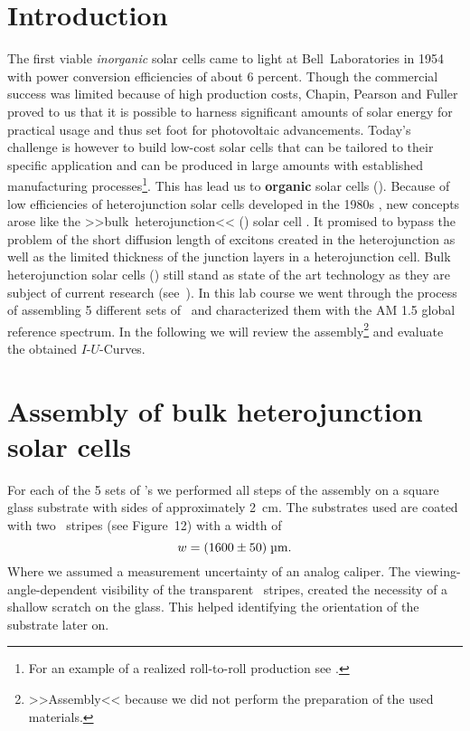 \documentclass[a4paper,10pt,twocolumn]{article}
\begin{document}
\begin{extract*}

\section*{Introduction}%

The first viable \textit{inorganic} solar cells came to light at Bell~Laboratories in 1954 \cite{siliconSC_1}\cite{siliconSC_2} with power conversion efficiencies of about 6 percent. Though the commercial success was limited because of high production costs, Chapin, Pearson and Fuller proved to us that it is possible to harness significant amounts of solar energy for practical usage and thus set foot for photovoltaic advancements.\mypar
Today's challenge is however to build low-cost solar cells that can be tailored to their specific application and can be produced in large amounts with established manufacturing processes\footnote{For an example of a realized roll-to-roll production see \cite{rolltoroll}.}. This has lead us to \textbf{organic} solar cells (\OSC).\mypar
Because of low efficiencies of heterojunction solar cells developed in the 1980s \cite{tang}, new concepts arose like the >>bulk~heterojunction<< (\BHJ) solar cell \cite{heterojunk}. It promised to bypass the problem of the short diffusion length of excitons created in the heterojunction as well as the limited thickness of the junction layers in a heterojunction cell.\mypar
Bulk heterojunction solar cells (\BHSC) still stand as state of the art technology as they are subject of current research (see~\cite{modernbulkhetero}). In this lab course we went through the process of assembling 5 different sets of \BHSC\ and characterized them with the {\os\sefo AM 1.5} global reference spectrum. In the following we will review the assembly\footnote{>>Assembly<< because we did not perform the preparation of the used materials.} and evaluate the obtained $I$-$U$-Curves. 

\section{Assembly of bulk heterojunction solar cells}\label{sec:assembly}
For each of the 5 sets of \BHSC's we performed all steps of the assembly on a square glass substrate with sides of approximately 2~cm. The substrates used are coated with two \ITO\ stripes (see \cite{labdesc} Figure~12) with a width of
\begin{equation*}
w = (1600\pm50)\;\text{\textmu m}.
\end{equation*}
Where we assumed a measurement uncertainty of an analog caliper. The viewing-angle-dependent visibility of the transparent \ITO\ stripes, created the necessity of a shallow scratch on the glass. This helped identifying the orientation of the substrate later on.\mypar



\end{extract*}
\end{document}
